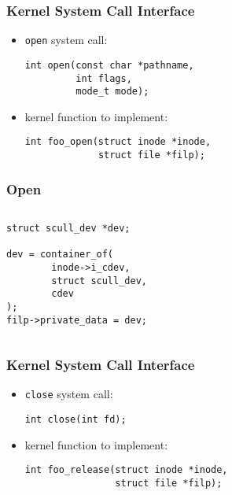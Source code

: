 \documentclass[dvipsnames]{beamer}
\begin{document}
\begin{frame}[fragile]
  \frametitle{Kernel System Call Interface}

  \begin{itemize}
    \item \lstinline|open| system call:
    \begin{lstlisting}
int open(const char *pathname,
         int flags,
         mode_t mode);
    \end{lstlisting}

    \medskip
    \item kernel function to implement:
    \begin{lstlisting}
int foo_open(struct inode *inode,
             struct file *filp);
    \end{lstlisting}
  \end{itemize}
\end{frame}

\begin{frame}[fragile]
  \frametitle{Open}

  \begin{columns}

    \begin{exampleblock}{}
      \begin{lstlisting}
struct scull_dev *dev;

dev = container_of(
        inode->i_cdev,
        struct scull_dev,
        cdev
);
filp->private_data = dev;
      \end{lstlisting}
    \end{exampleblock}
  \end{columns}
\end{frame}
%
%

\begin{frame}[fragile]
  \frametitle{Kernel System Call Interface}

  \begin{itemize}
    \item \lstinline|close| system call:
    \begin{lstlisting}
int close(int fd);
    \end{lstlisting}

    \medskip
    \item kernel function to implement:
    \begin{lstlisting}
int foo_release(struct inode *inode,
                struct file *filp);
    \end{lstlisting}
  \end{itemize}
\end{frame}
\end{document}
